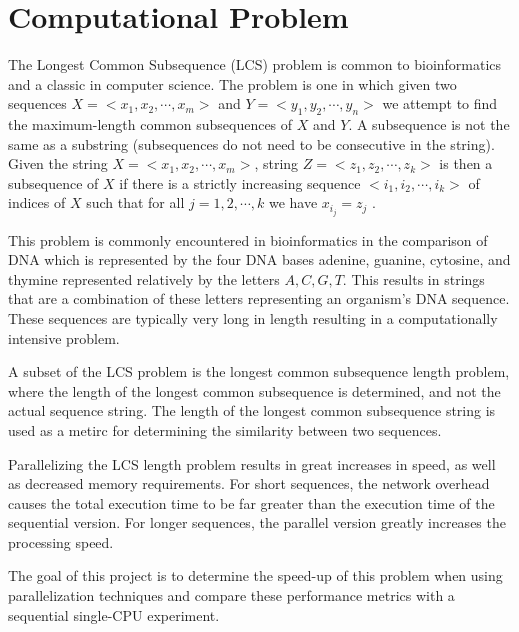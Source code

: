 \section{Computational Problem}
The Longest Common Subsequence (LCS) problem is common to
bioinformatics and a classic in computer science.  The problem is one
in which given two sequences $X=<x_1,x_2,\cdots,x_m>$ and
$Y=<y_1,y_2,\cdots,y_n>$ we attempt to find the maximum-length common
subsequences of $X$ and $Y$. A subsequence is not the same as a
substring (subsequences do not need to be consecutive in the
string). Given the string $X=<x_1,x_2,\cdots,x_m>$, string
$Z=<z_1,z_2,\cdots,z_k>$ is then a subsequence of $X$ if there is a
strictly increasing sequence $<i_1,i_2,\cdots,i_k>$ of indices of $X$
such that for all $j=1,2,\cdots,k$ we have $x_{i_j} = z_j$
\cite{cormen01}.

This problem is commonly encountered in bioinformatics in the
comparison of DNA which is represented by the four DNA bases adenine,
guanine, cytosine, and thymine represented relatively by the letters
${A,C,G,T}$. This results in strings that are a combination of these
letters representing an organism's DNA sequence. These sequences are
typically very long in length resulting in a computationally intensive
problem.

A subset of the LCS problem is the longest common subsequence length
problem, where the length of the longest common subsequence is
determined, and not the actual sequence string. The length of the
longest common subsequence string is used as a metirc for determining
the similarity between two sequences.

Parallelizing the LCS length problem results in great increases in
speed, as well as decreased memory requirements. For short sequences,
the network overhead causes the total execution time to be far greater
than the execution time of the sequential version. For longer
sequences, the parallel version greatly increases the processing
speed.

The goal of this project is to determine the speed-up of this problem
when using parallelization techniques and compare these performance
metrics with a sequential single-CPU experiment.

